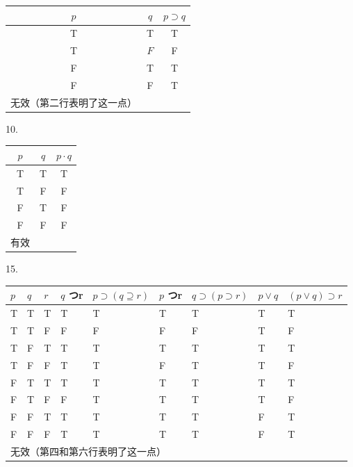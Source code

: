\begin{center}
\begin{tabular}{|ccc|}
\hline
$p$ & $q$ & $p \supset q$ \\
\hline
T & T & T \\
T & $F$ & F \\
F & T & T \\
F & F & T \\
\hline
无效（第二行表明了这一点） &  &  \\
\hline
\end{tabular}
\end{center}

10.

\begin{center}
\begin{tabular}{|ccc|}
\hline
$p$ & $q$ & $p \cdot q$ \\
\hline
T & T & T \\
T & F & F \\
F & T & F \\
F & F & F \\
\hline
有效 &  &  \\
\hline
\end{tabular}
\end{center}

15.

\begin{center}
\begin{tabular}{|l|l|l|l|l|l|l|l|l|}
\hline
$p$ & $q$ & $r$ & $q$ つr & $p \supset(q \supseteq r)$ & $p$ つr & $q \supset(p \supset r)$ & $p \vee q$ & $(p \vee q) \supset r$ \\
\hline
T & T & T & T & T & T & T & T & T \\
\hline
T & T & F & F & F & F & F & T & F \\
\hline
T & F & T & T & T & T & T & T & T \\
\hline
T & F & F & T & T & F & T & T & F \\
\hline
F & T & T & T & T & T & T & T & T \\
\hline
F & T & F & F & T & T & T & T & F \\
\hline
F & F & T & T & T & T & T & F & T \\
\hline
F & F & F & T & T & T & T & F & T \\
\hline
\multicolumn{9}{|l|}{无效（第四和第六行表明了这一点）} \\
\hline
\end{tabular}
\end{center}

